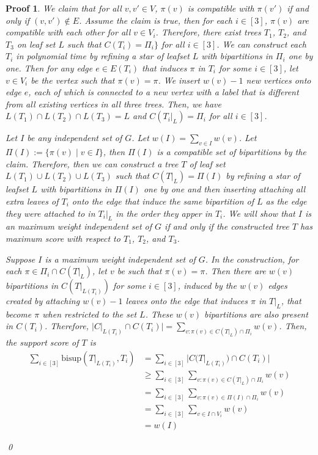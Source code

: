 \documentclass{bmcart}
\newcommand{\bs}{\mathrm{bisup}}
\theoremstyle{mystyle}
\theoremstyle{proofstyle}
\newtheorem*{proof2}{Proof}
\newenvironment{proofnospace}{\begin{proof2}}{\qed \end{proof2}}
\begin{document}
\begin{proofnospace}
  We claim that for all $v,v' \in V$, $\pi(v)$ is compatible with $\pi(v')$ if and only if $(v,v') \notin E$. Assume the claim is true, then for each $i \in [3]$, $\pi(v)$ are compatible with each other for all $v \in V_i$. Therefore, there exist trees $T_1$, $T_2$, and $T_3$ on leaf set $L$ such that $C(T_i) = \Pi_i\}$ for all $i \in [3]$. We can construct each $T_i$ in polynomial time by refining a star of leafset $L$ with bipartitions in $\Pi_i$ one by one. Then for any edge $e \in E(T_i)$ that induces $\pi$ in $T_i$ for some $i \in [3]$, let $v \in V_i$ be the vertex such that $\pi(v) = \pi$. We insert $w(v)-1$ new vertices onto edge $e$, each of which is connected to a new vertex with a label that is different from all existing vertices in all three trees. Then, we have $L(T_1) \cap L(T_2) \cap L(T_3) = L$ and $C(T_i|_L) = \Pi_i$ for all $i \in [3]$. \smallskip

  Let $I$ be any independent set of $G$. Let $w(I) = \sum_{v \in I} w(v)$. Let $\Pi(I) := \{\pi(v) \mid v \in I\}$, then $\Pi(I)$ is a compatible set of bipartitions by the claim. Therefore, then we can construct a tree $T$ of leaf set $L(T_1) \cup L(T_2) \cup L(T_3)$ such that $C(T|_L) = \Pi(I)$ by refining a star of leafset $L$ with bipartitions in $\Pi(I)$ one by one and then inserting attaching all extra leaves of $T_i$ onto the edge that induce the same bipartition of $L$ as the edge they were attached to in $T_i|_L$ in the order they apper in $T_i$. We will show that $I$ is an maximum weight independent set of $G$ if and only if the constructed tree $T$ has maximum score with respect to $T_1$, $T_2$, and $T_3$.\smallskip

  Suppose $I$ is a maximum weight independent set of $G$. In the construction, for each $\pi \in \Pi_i \cap C(T|_L)$, let $v$ be such that $\pi(v) = \pi$. Then there are $w(v)$ bipartitions in $C(T|_{L(T_i)})$ for some $i \in [3]$, induced by the $w(v)$ edges created by attaching $w(v)-1$ leaves onto the edge that induces $\pi$ in $T|_L$, that become $\pi$ when restricted to the set $L$. These $w(v)$ bipartitions are also present in $C(T_i)$. Therefore, $|C|_{L(T_i)} \cap C(T_i)| = \sum_{v: \pi(v) \in C(T|_L)\cap \Pi_i} w(v)$. Then, the support score of $T$ is
  \begin{align*}
    \sum_{i \in [3]}\bs(T|_{L(T_i)}, T_i) &= \sum_{i \in [3]}|C(T|_{L(T_i)}) \cap C(T_i)| \\
    &\ge \sum_{i \in [3]} \sum_{v: \pi(v) \in C(T|_L)\cap \Pi_i} w(v) \\
    &= \sum_{i \in [3]} \sum_{v: \pi(v) \in \Pi(I) \cap \Pi_i} w(v) \\
    &= \sum_{i \in [3]} \sum_{v \in I \cap V_i} w(v) \\
    &= w(I)
  \end{align*}
  


\end{proofnospace}
\end{document}
